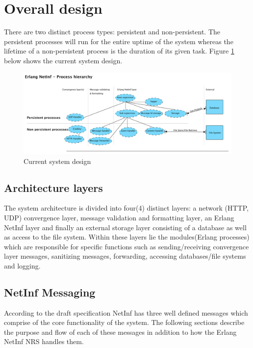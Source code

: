 \section {Overall design}

There are two distinct process types: persistent and non-persistent. The persistent processes will run for the entire uptime of the system whereas the lifetime of a non-persistent process is the duration of its given task. Figure \ref{fig:processhi} below shows the current system design.

\begin{figure}[H]
	\centering
\centerline{\includegraphics[width=1.2\textwidth]{./img/process_hierarchy.png}}
\caption{Current system design}
\label{fig:processhi}
\end{figure}

\subsection{Architecture layers}

The system architecture is divided into four(4) distinct layers: a network (HTTP, UDP) convergence layer, message validation and formatting layer, an Erlang NetInf layer and finally an external storage layer consisting of a database as well as access to the file system. Within these layers lie the modules(Erlang processes) which are responsible for specific functions such as sending/receiving convergence layer messages, sanitizing messages, forwarding, accessing databases/file systems and logging.

\subsection{NetInf Messaging}

According to the draft specification\cite{netinfproto} NetInf has three well defined messages which comprise of the core functionality of the system. The following sections describe the purpose and flow of each of these messages in addition to how the Erlang NetInf NRS handles them.

